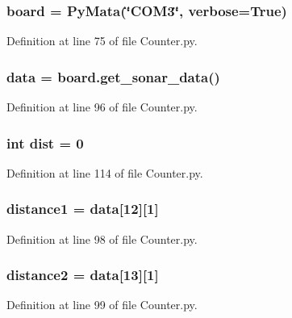 \subsubsection[{board}]{\setlength{\rightskip}{0pt plus 5cm}board = Py\+Mata(\char`\"{}C\+O\+M3\char`\"{}, verbose=True)}\label{namespace_counter_af3184e6d3aac51d64ce9a9af9571c9c0}


Definition at line 75 of file Counter.\+py.

\subsubsection[{data}]{\setlength{\rightskip}{0pt plus 5cm}data = board.\+get\+\_\+sonar\+\_\+data()}\label{namespace_counter_a511ae0b1c13f95e5f08f1a0dd3da3d93}


Definition at line 96 of file Counter.\+py.

\subsubsection[{dist}]{\setlength{\rightskip}{0pt plus 5cm}int dist = 0}\label{namespace_counter_a62d19f1b68cc51e55723b31a29cdef78}


Definition at line 114 of file Counter.\+py.

\subsubsection[{distance1}]{\setlength{\rightskip}{0pt plus 5cm}distance1 = {\bf data}[12][1]}\label{namespace_counter_a6bf62367f02a224fdd2fe85ee50ba6ea}


Definition at line 98 of file Counter.\+py.

\subsubsection[{distance2}]{\setlength{\rightskip}{0pt plus 5cm}distance2 = {\bf data}[13][1]}\label{namespace_counter_a253d925c9f0934281d81c1c4037011a0}


Definition at line 99 of file Counter.\+py.

